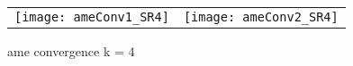 \begin{figure}[ht]
	\centering
	\begin{tabular}{cc}
	\texttt{[image: ameConv1\_SR4]} &
	\texttt{[image: ameConv2\_SR4]}
	\end{tabular}
	\caption{ame convergence k = 4}
	\label{fig:ameConv}
\end{figure}
\FloatBarrier
\newpage

% 
% 



